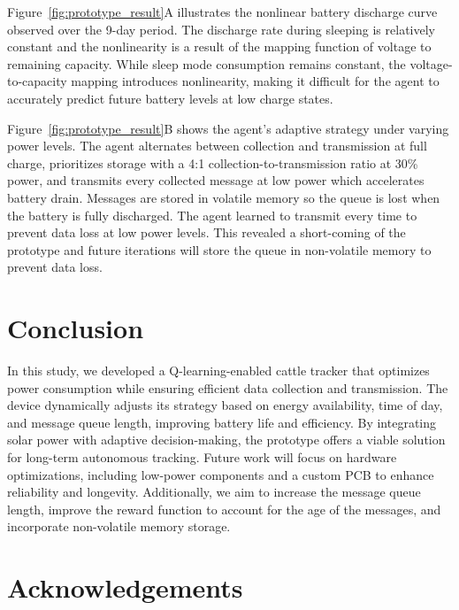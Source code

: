 \documentclass[10pt]{cai}
\begin{document}
Figure~\ref{fig:prototype_result}A illustrates the nonlinear battery discharge curve observed over the 9-day period.  
The discharge rate during sleeping is relatively constant and the nonlinearity is a result of the mapping function of voltage to remaining capacity.
While sleep mode consumption remains constant, the voltage-to-capacity mapping introduces nonlinearity, making it difficult for the agent to accurately predict future battery levels at low charge states.

Figure~\ref{fig:prototype_result}B shows the agent's adaptive strategy under varying power levels.
The agent alternates between collection and transmission at full charge, prioritizes storage with a 4:1 collection-to-transmission ratio at 30\% power, and transmits every collected message at low power which accelerates battery drain.
Messages are stored in volatile memory so the queue is lost when the battery is fully discharged.
The agent learned to transmit every time to prevent data loss at low power levels.
This revealed a short-coming of the prototype and future iterations will store the queue in non-volatile memory to prevent data loss.

\section{Conclusion}
In this study, we developed a Q-learning-enabled cattle tracker that optimizes power consumption while ensuring efficient data collection and transmission. 
The device dynamically adjusts its strategy based on energy availability, time of day, and message queue length, improving battery life and efficiency. 
By integrating solar power with adaptive decision-making, the prototype offers a viable solution for long-term autonomous tracking. 
Future work will focus on hardware optimizations, including low-power components and a custom PCB to enhance reliability and longevity. 
Additionally, we aim to increase the message queue length, improve the reward function to account for the age of the messages, and incorporate non-volatile memory storage.


\section*{Acknowledgements}

\printbibliography[heading=subbibintoc]
\end{document}
